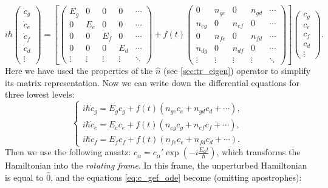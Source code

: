 \documentclass[12pt, twoside]{report}
\numberwithin{equation}{section}
\begin{document}
\begin{equation}
i\hbar \left(
\begin{matrix}
\dot c_g \\
\dot c_e\\
\dot c_f\\
\dot c_d\\
\vdots
\end{matrix}
\right) = 
\left[\left(
\begin{matrix}
E_g & 0 & 0 & 0 & \cdots\\
0 &E_e & 0 & 0 & \cdots\\
0 & 0 & E_f & 0 & \cdots\\
0 & 0 & 0 & E_d & \cdots\\
\vdots&\vdots&\vdots&\vdots& \ddots
\end{matrix}
\right)
+
f(t)
\left(
\begin{matrix}
0          & n_{ge} & 0         & n_{gd} & \cdots\\
n_{eg} & 0          & n_{ef} & 0         & \cdots\\
0          & n_{fe}  & 0         & n_{fd} & \cdots\\
n_{dg} & 0          & n_{df} & 0         & \cdots\\
\vdots&\vdots&\vdots&\vdots& \ddots
\end{matrix}
\right)\right]
\left(
\begin{matrix}
c_g\\
c_e\\
c_f\\
c_d\\
\vdots
\end{matrix}
\right).
\end{equation}
Here we have used the properties of the $\hat n$ (see \autoref{sec:tr_eigen}) operator to simplify its matrix representation. Now we can write down the differential equations for three lowest levels:
\begin{equation}
\begin{cases}
i\hbar \dot c_g = E_g c_g + f(t) (n_{ge} c_e + n_{gd} c_d + \cdots),\\
i\hbar \dot c_e = E_e c_e + f(t) (n_{eg} c_g + n_{ef} c_f + \cdots),\\
i\hbar \dot c_f = E_f c_f + f(t) (n_{fe} c_e + n_{fd} c_d + \cdots).
\end{cases}
\label{eq:c_gef_ode}
\end{equation}
Then we use the following ansatz: $c_\alpha = c_\alpha' \exp( - i \frac{E_\alpha t}{\hbar})$, which transforms the Hamiltonian into the \textit{rotating frame}. In this frame, the unperturbed Hamiltonian is equal to $\hat 0$, and the equations \eqref{eq:c_gef_ode} become (omitting apostrophes):
\end{document}
